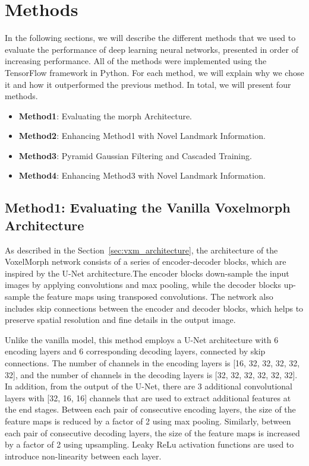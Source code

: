 \documentclass{report}
\begin{document}
	\chapter{Methods}
	
	In the following sections, we will describe the different methods that we used to evaluate the performance of deep learning neural networks, presented in order of increasing performance. All of the methods were implemented using the TensorFlow framework in Python. For each method, we will explain why we chose it and how it outperformed the previous method. In total, we will present four methods.
	\begin{itemize}
		\item \textbf{Method1}: Evaluating the morph Architecture.
		\item \textbf{Method2}: Enhancing Method1 with Novel Landmark Information.
		\item \textbf{Method3}: Pyramid Gaussian Filtering and Cascaded Training.
		\item \textbf{Method4}: Enhancing Method3 with Novel Landmark Information.
	\end{itemize}

	\section{Method1: Evaluating the Vanilla Voxelmorph Architecture}\label{sec:method1}
	
	As described in the Section~\ref{sec:vxm_architecture}, the architecture of the VoxelMorph network consists of a series of encoder-decoder blocks, which are inspired by the U-Net architecture.The encoder blocks down-sample the input images by applying convolutions and max pooling, while the decoder blocks up-sample the feature maps using transposed convolutions. The network also includes skip connections between the encoder and decoder blocks, which helps to preserve spatial resolution and fine details in the output image.
	
	Unlike the vanilla  model, this method employs a U-Net architecture with 6 encoding layers and 6 corresponding decoding layers, connected by skip connections. The number of channels in the encoding layers is [16, 32, 32, 32, 32, 32], and the number of channels in the decoding layers is [32, 32, 32, 32, 32, 32]. In addition, from the output of the U-Net, there are 3 additional convolutional layers with [32, 16, 16] channels that are used to extract additional features at the end stages. Between each pair of consecutive encoding layers, the size of the feature maps is reduced by a factor of 2 using max pooling. Similarly, between each pair of consecutive decoding layers, the size of the feature maps is increased by a factor of 2 using upsampling. Leaky ReLu activation functions are used to introduce non-linearity between each layer.
	
\end{document}
